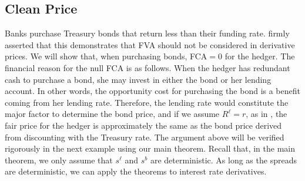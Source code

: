 \documentclass[a4paper, 11pt]{article}              %
\numberwithin{equation}{section}
\theoremstyle{plain}
\newcommand{\1}{\mathds{1}}
\theoremstyle{plain}
\theoremstyle{definition}
\theoremstyle{plain}
\begin{document}
\subsection{Clean Price}
Banks purchase Treasury bonds that return less than their funding
rate. \cite{hull2012fva} firmly asserted that this demonstrates that FVA should not be
considered in derivative prices.  We will show that, when purchasing bonds, FCA$=0$
for the hedger. The financial reason for the null FCA is as follows. When the
hedger has redundant cash to purchase a bond, she may invest in either the bond or
her lending account. In other words, the opportunity cost for purchasing the bond is a  benefit coming from her lending rate. Therefore, the lending rate would
constitute
the major factor to determine the bond price, and if we assume $R^\ell = r$, as in
\cite{burgard2010partial}, the fair price for the hedger is approximately the
same as the bond price derived from discounting with the Treasury rate.  The
argument above will be verified rigorously in the next example using our main
theorem.  Recall that, in the main theorem, we only assume that $s^\ell$ and
$s^b$ are deterministic. As long as the spreads are deterministic, we can apply
the theorems to interest rate derivatives.
\end{document}
